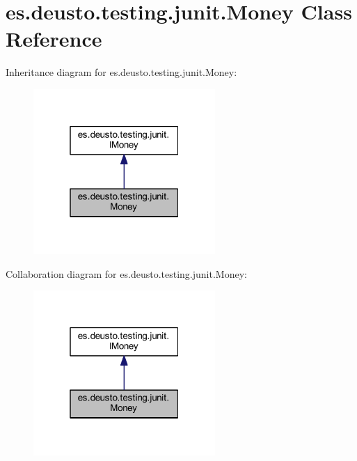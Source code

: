 \hypertarget{classes_1_1deusto_1_1testing_1_1junit_1_1_money}{}\section{es.\+deusto.\+testing.\+junit.\+Money Class Reference}
\label{classes_1_1deusto_1_1testing_1_1junit_1_1_money}


Inheritance diagram for es.\+deusto.\+testing.\+junit.\+Money\+:\nopagebreak
\begin{figure}[H]
\begin{center}
\leavevmode
\includegraphics[width=196pt]{classes_1_1deusto_1_1testing_1_1junit_1_1_money__inherit__graph}
\end{center}
\end{figure}


Collaboration diagram for es.\+deusto.\+testing.\+junit.\+Money\+:\nopagebreak
\begin{figure}[H]
\begin{center}
\leavevmode
\includegraphics[width=196pt]{classes_1_1deusto_1_1testing_1_1junit_1_1_money__coll__graph}
\end{center}
\end{figure}
